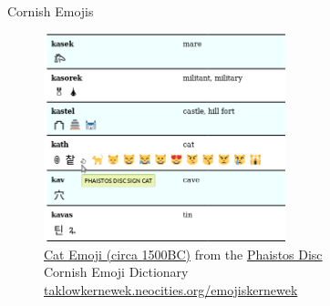 \documentclass{beamer}
\begin{document}
\begin{frame}[plain]{Cornish Emojis}
\begin{figure}
 \begin{center}
\includegraphics[width=7cm]{emojis_example.png}
 \end{center}
 \caption{\href{https://unicode-table.com/101ec}{Cat Emoji (circa 1500BC)} from the \href{https://unicode-table.com/en/blocks/phaistos-disc/}{Phaistos Disc}\\
 Cornish Emoji Dictionary \href{https://taklowkernewek.neocities.org/emojiskernewek}{taklowkernewek.neocities.org/emojiskernewek}}
 \label{fig:emojis}
\end{figure}
\end{frame}
\end{document}
